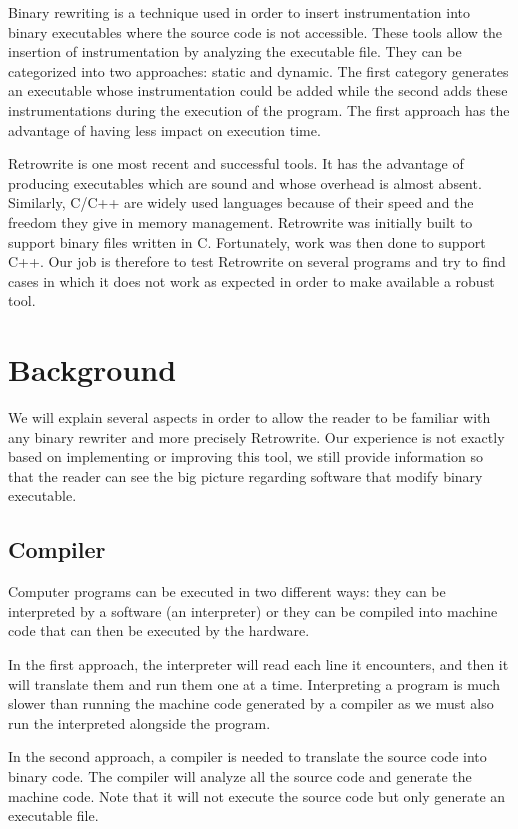 \documentclass[a4paper,11pt,oneside]{report}
\newcommand{\sysname}{Retrowrite\xspace}
\begin{document}
Binary rewriting is a technique used in order to insert instrumentation into
binary executables where the source code is not accessible. These tools allow
the insertion of instrumentation by analyzing the executable file. They can be
categorized into two approaches: static and dynamic. The first category
generates an executable whose instrumentation could be added while the second
adds these instrumentations during the execution of the program. The first
approach has the advantage of having less impact on execution time.

Retrowrite is one most recent and successful tools. It has the advantage of
producing executables which are sound and whose overhead is almost absent.
Similarly, C/C++ are widely used languages because of their speed and the
freedom they give in memory management. Retrowrite was initially built to
support binary files written in C. Fortunately, work was then done to support
C++. Our job is therefore to test Retrowrite on several programs and try to
find cases in which it does not work as expected in order to make available a
robust tool.

\chapter{Background}
We will explain several aspects in order to allow the reader to be familiar
with any binary rewriter and more precisely \sysname. Our experience is not
exactly based on implementing or improving this tool, we still provide information
so that the reader can see the big picture regarding software that modify binary
executable.

\section{Compiler}
Computer programs can be executed in two different ways: they can be interpreted
by a software (an interpreter) or they can be compiled into machine code that can
then be executed by the hardware. 


In the first approach, the interpreter will read each line it encounters, and
then it will translate them and run them one at a time. Interpreting a program
is much slower than running the machine code generated by a compiler as we must
also run the interpreted alongside the program.

In the second approach, a compiler is needed to translate the source code into
binary code.
The compiler will analyze all the source code and generate the machine code.
Note that it will not execute the source code but only generate an executable
file.
\end{document}
